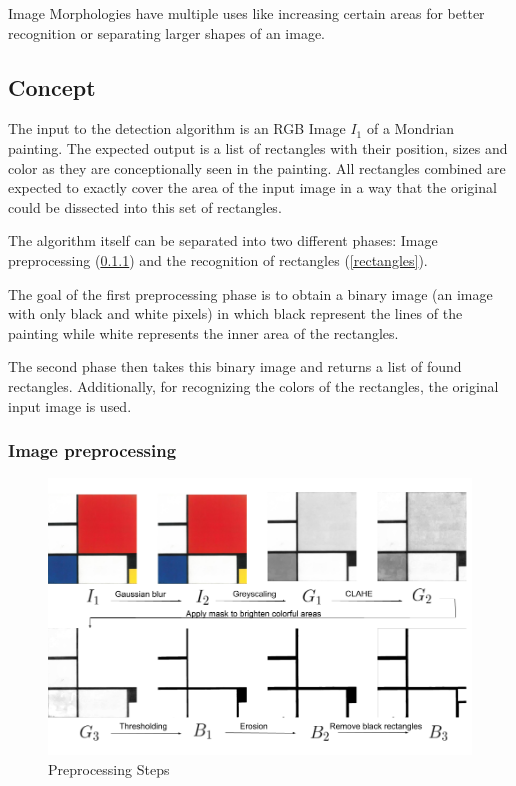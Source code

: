 Image Morphologies have multiple uses like increasing certain areas for better
recognition or separating larger shapes of an image.

\subsection{Concept}



The input to the detection algorithm is an RGB Image $I_1$ of a Mondrian
painting. The expected output is a list of rectangles with their position, sizes
and color as they are conceptionally seen in the painting. All rectangles
combined are expected to exactly cover the area of the input image in a way that
the original could be dissected into this set of rectangles.

The algorithm itself can be separated into two different phases: Image
preprocessing (\ref{preprocessing}) and the recognition of rectangles (\ref{rectangles}).

The goal of the first preprocessing phase is to obtain a binary image (an image
with only black and white pixels) in which black represent the lines of the
painting while white represents the inner area of the rectangles.

The second phase then takes this binary image and returns a list of found
rectangles. Additionally, for recognizing the colors of the rectangles, the
original input image is used.

\subsubsection{Image preprocessing} \label{preprocessing}

\begin{figure}
  \includegraphics[width=\linewidth]{preprocessing_steps.png}
  \caption{Preprocessing Steps}
  \label{fig:preprocessing}
\end{figure}

